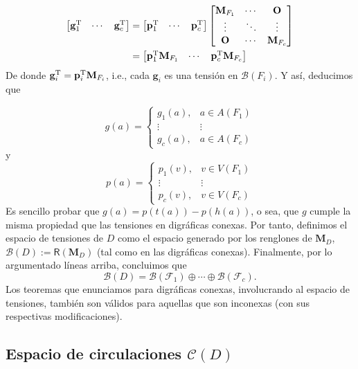 \begin{align*}
    \begin{bmatrix}
\mathbf{g}_{1}^{\textnormal{T}} & \cdots  & \mathbf{g}_{c}^{\textnormal{T}} 
\end{bmatrix} &= \begin{bmatrix}
\mathbf{p}_{1}^{\textnormal{T}} & \cdots  & \mathbf{p}_{c}^{\textnormal{T}} 
\end{bmatrix} \begin{bmatrix}
\mathbf{M}_{F_{1}} & \cdots  & \mathbf{O} \\ 
\vdots & \ddots  & \vdots \\ 
\mathbf{O} & \cdots & \mathbf{M}_{F_{c}}
\end{bmatrix}\\ &= \begin{bmatrix}
 \mathbf{p}_{1}^{\textnormal{T}}\mathbf{M}_{F_{1}} & \cdots &  \mathbf{p}_{c}^{\textnormal{T}}\mathbf{M}_{F_{c}}
\end{bmatrix}
\end{align*}
De donde $\mathbf{g}_{i}^{\textnormal{T}} = \mathbf{p}_{i}^{\textnormal{T}}\mathbf{M}_{F_{i}}$, i.e., cada $\mathbf{g}_{i}$ es una tensión en $\mathcal{B}(F_{i})$. Y así, deducimos que

$$
g(a) = \left\{\begin{matrix}
g_{1}(a), & a \in A(F_{1})\\ 
\vdots & \vdots \\ 
g_{c}(a), & a \in A(F_{c})
\end{matrix}\right.
$$
y
$$
p(a) = \left\{\begin{matrix}
p_{1}(v), & v \in V(F_{1})\\ 
\vdots & \vdots \\ 
p_{c}(v), & v \in V(F_{c})
\end{matrix}\right.
$$
Es sencillo probar que $g(a) = p(t(a)) - p(h(a))$, o sea, que $g$ cumple la misma propiedad que las tensiones en digráficas conexas. Por tanto, definimos  el espacio de tensiones de $D$ como el espacio generado por los renglones de $\mathbf{M}_{D}$, $\mathcal{B}(D):=\mathsf{R}(\mathbf{M}_{D})$ (tal como en las digráficas conexas). Finalmente, por lo argumentado líneas arriba, concluimos que
$$
\mathcal{B}(D) = \mathcal{B}(\mathcal{F}_{1}) \oplus \cdots \oplus \mathcal{B}(\mathcal{F}_{c}).
$$
Los teoremas que enunciamos para digráficas conexas, involucrando al espacio de tensiones, también son válidos para aquellas que son inconexas (con sus respectivas modificaciones).


\subsection{Espacio de circulaciones $\mathcal{C}(D)$}

